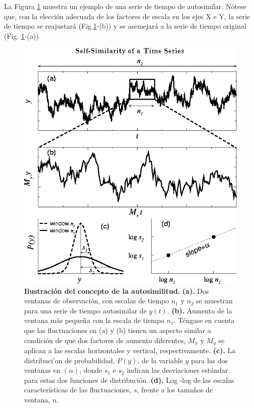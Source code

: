 \documentclass[letterpaper,titlepage,12pt,draft]{report}
\begin{document}
La Figura \ref{fig:prob} muestra un ejemplo de una serie de tiempo de autosimilar. N\'otese que, con la elecci\'on adecuada de los factores de escala en los ejes X e Y, la serie de tiempo se reajustar\'a (Fig.\ref{fig:prob}-(b)) y se asemejar\'a a la serie de tiempo original (Fig.
\ref{fig:prob}-(a)). 

\begin{figure}[H]
\begin{center}
\includegraphics[scale=0.38]{prob.png}
\caption{{\bf Ilustraci\'on del concepto de la autosimilitud.} {\bf (a).} Dos ventanas de observaci\'on, con escalas de tiempo $n_1$ y $n_2$ se muestran para una serie de tiempo autosimilar de $y(t)$. {\bf (b).} Aumento de la ventana m\'as peque\~na con la escala de tiempo $n_1$. T\'engase en cuenta que las fluctuaciones en (a) y (b) tienen un aspecto similar a condici\'on de que dos factores de aumento diferentes, $M_x$ y $M_y$ se aplican a las escalas horizontales y vertical, respectivamente. {\bf (c).} La distribuci'on de probabilidad, $P(y)$, de la variable $y$ para las dos ventanas en $(\alpha)$, donde $s_1$ e $s_2$ indican las desviaciones est\'andar para estas dos funciones de distribuci\'on. {\bf (d).} Log -log de las escalas caracter\'isticas de las fluctuaciones, $s$, frente a los tama\~nos de ventana, $n$.}
\label{fig:prob}
\end{center}
\end{figure}
\end{document}
